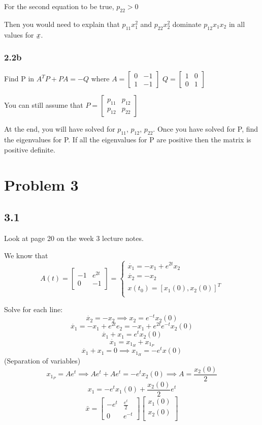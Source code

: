 \documentclass[12pt]{article}
\newcommand{\ubar}[1]{\underaccent{\bar}{#1}}
\begin{document}
For the second equation to be true, $p_{22}>0$ 

Then you would need to explain that $p_{11}x_{1}^2$ and $p_{22}x_{2}^2$ dominate $p_{12}x_1x_2$ in all values for $\ubar{x}$. 

\subsubsection*{2.2b}
Find P in $A^TP+PA=-Q$ where 
$A=\begin{bmatrix} 0 & -1 \\
1 & -1
\end{bmatrix}$
$Q=\begin{bmatrix} 1 & 0 \\
0 & 1
\end{bmatrix}$

You can still assume that $P=\begin{bmatrix} p_{11} & p_{12} \\
p_{12} & p_{22}
\end{bmatrix}$

At the end, you will have solved for $p_{11}$, $p_{12}$, $p_{22}$. Once you have solved for P, find the eigenvalues for P. If all the eigenvalues for P are positive then the matrix is positive definite. 

\section*{Problem 3}
\subsection*{3.1}
Look at page 20 on the week 3 lecture notes. 

We know that
$$A(t)=\begin{bmatrix} -1 & e^{2t} \\
0 & -1
\end{bmatrix}=\begin{cases}\dot{x_1}=-x_1+e^{2t}x_2\\ 
\dot{x_2}=-x_2\\ 
x(t_0)=[x_1(0), x_2(0)]^T\\
\end{cases}$$ 

Solve for each line:
$$\dot{x_2}=-x_2\implies x_2=e^{-t}x_2(0)$$
$$\dot{x_1}=-x_1+e^{2t}e_2=-x_1+e^{2t}e^{-t}x_2(0)$$
$$\dot{x_1}+x_1=e^tx_2(0)$$
$$\dot{x_1}=x_{1_H}+x_{1_P}$$
$$\dot{x_1}+x_1=0\implies x_{1_H}=-e^tx(0)$$ (Separation of variables)
$$x_{1_P}=Ae^t\implies Ae^t+Ae^t=-e^tx_2(0)\implies A=\frac{x_2(0)}{2}$$
$$x_1=-e^tx_1(0)+\frac{x_2(0)}{2}e^t$$
$$\bar{x}=\begin{bmatrix} -e^t & \frac{e^t}{2} \\
0 & e^{-t}
\end{bmatrix}
\begin{bmatrix}x_1(0)\\ 
x_2(0)\\ 
\end{bmatrix}$$ 
\end{document}
